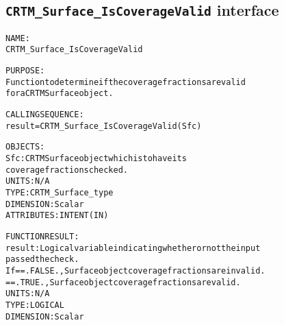 \subsection{\texttt{CRTM\_Surface\_IsCoverageValid} interface}
  \label{sec:CRTM_Surface_IsCoverageValid_interface}
  \begin{alltt}
 
  NAME:
        CRTM_Surface_IsCoverageValid
 
  PURPOSE:
        Function to determine if the coverage fractions are valid
        for a CRTM Surface object.
 
  CALLING SEQUENCE:
        result = CRTM_Surface_IsCoverageValid( Sfc )
 
  OBJECTS:
        Sfc:       CRTM Surface object which is to have its
                   coverage fractions checked.
                   UNITS:      N/A
                   TYPE:       CRTM_Surface_type
                   DIMENSION:  Scalar
                   ATTRIBUTES: INTENT(IN)
 
  FUNCTION RESULT:
        result:    Logical variable indicating whether or not the input
                   passed the check.
                   If == .FALSE., Surface object coverage fractions are invalid.
                      == .TRUE.,  Surface object coverage fractions are valid.
                   UNITS:      N/A
                   TYPE:       LOGICAL
                   DIMENSION:  Scalar
 
  \end{alltt}
